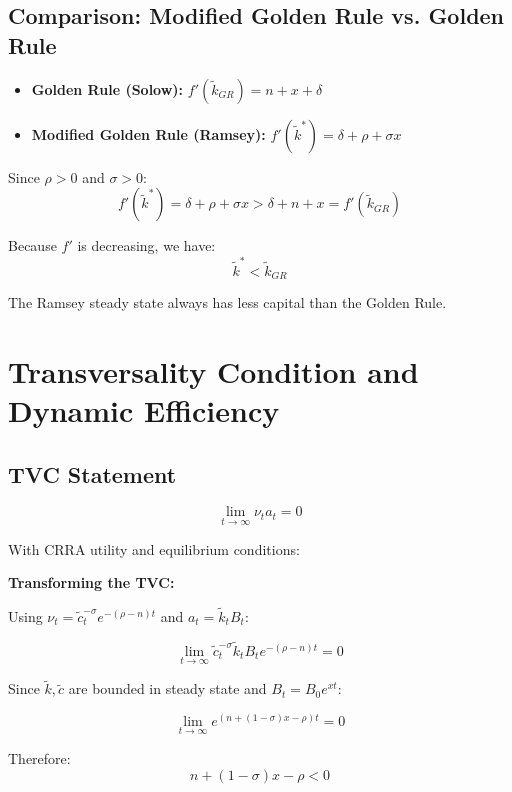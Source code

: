 \documentclass[a4paper,11pt]{article}
\newcommand{\ktilde}{\tilde{k}}
\newcommand{\ctilde}{\tilde{c}}
\begin{document}
\subsection*{Comparison: Modified Golden Rule vs. Golden Rule}

\begin{itemize}
    \item \textbf{Golden Rule (Solow):} $f'(\ktilde_{GR}) = n + x + \delta$
    \item \textbf{Modified Golden Rule (Ramsey):} $f'(\ktilde^*) = \delta + \rho + \sigma x$
\end{itemize}

Since $\rho > 0$ and $\sigma > 0$:
\[
f'(\ktilde^*) = \delta + \rho + \sigma x > \delta + n + x = f'(\ktilde_{GR})
\]

Because $f'$ is decreasing, we have:
\[
\boxed{\ktilde^* < \ktilde_{GR}}
\tag{Key-Insight}
\]

The Ramsey steady state always has less capital than the Golden Rule.

\section{Transversality Condition and Dynamic Efficiency}

\subsection*{TVC Statement}
\[
\lim_{t \to \infty} \nu_t a_t = 0
\tag{TVC}
\]

With CRRA utility and equilibrium conditions:

\begin{derivationbox}
\textbf{Transforming the TVC:}

Using $\nu_t = \ctilde_t^{-\sigma} e^{-(\rho-n)t}$ and $a_t = \ktilde_t B_t$:

\[
\lim_{t \to \infty} \ctilde_t^{-\sigma} \ktilde_t B_t e^{-(\rho-n)t} = 0
\]

Since $\ktilde, \ctilde$ are bounded in steady state and $B_t = B_0 e^{xt}$:

\[
\lim_{t \to \infty} e^{(n + (1-\sigma)x - \rho)t} = 0
\]

Therefore:
\[
\boxed{n + (1-\sigma)x - \rho < 0}
\tag{TVC-Condition}
\]
\end{derivationbox}
\end{document}
